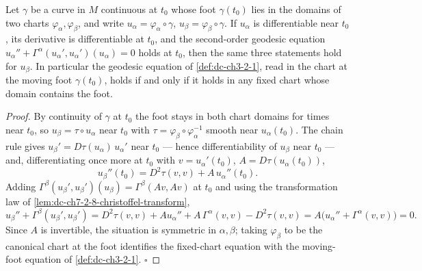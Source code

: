 \begin{lemma}
  \label{lem:dc-ch7-2-8-chart-independence}
  \leanok
  Let $\gamma$ be a curve in $M$ continuous at $t_0$ whose foot $\gamma(t_0)$ lies
  in the domains of two charts $\varphi_\alpha,\varphi_\beta$, and write
  $u_\alpha=\varphi_\alpha\circ\gamma$, $u_\beta=\varphi_\beta\circ\gamma$. If
  $u_\alpha$ is differentiable near $t_0$, its derivative is differentiable at
  $t_0$, and the second-order geodesic equation
  $u_\alpha''+\Gamma^\alpha(u_\alpha',u_\alpha')(u_\alpha)=0$ holds at $t_0$, then
  the same three statements hold for $u_\beta$. In particular the geodesic
  equation of \cref{def:dc-ch3-2-1}, read in the chart at the moving foot
  $\gamma(t_0)$, holds if and only if it holds in any fixed chart whose domain
  contains the foot.
\end{lemma}
\begin{proof}
  \leanok
  By continuity of $\gamma$ at $t_0$ the foot stays in both chart domains for
  times near $t_0$, so $u_\beta=\tau\circ u_\alpha$ near $t_0$ with
  $\tau=\varphi_\beta\circ\varphi_\alpha^{-1}$ smooth near $u_\alpha(t_0)$. The
  chain rule gives $u_\beta'=D\tau(u_\alpha)\,u_\alpha'$ near $t_0$ — hence
  differentiability of $u_\beta$ near $t_0$ — and, differentiating once more at
  $t_0$ with $v=u_\alpha'(t_0)$, $A=D\tau(u_\alpha(t_0))$,
  $$
  u_\beta''(t_0)=D^2\tau(v,v)+A\,u_\alpha''(t_0).
  $$
  Adding $\Gamma^\beta(u_\beta',u_\beta')(u_\beta)=\Gamma^\beta(Av,Av)$ at $t_0$ and
  using the transformation law of \cref{lem:dc-ch7-2-8-christoffel-transform},
  $$
  u_\beta''+\Gamma^\beta(u_\beta',u_\beta')
   = D^2\tau(v,v)+A u_\alpha''+A\,\Gamma^\alpha(v,v)-D^2\tau(v,v)
   = A\bigl(u_\alpha''+\Gamma^\alpha(v,v)\bigr)=0 .
  $$
  Since $A$ is invertible, the situation is symmetric in $\alpha,\beta$; taking
  $\varphi_\beta$ to be the canonical chart at the foot identifies the fixed-chart
  equation with the moving-foot equation of \cref{def:dc-ch3-2-1}. $\square$
\end{proof}

